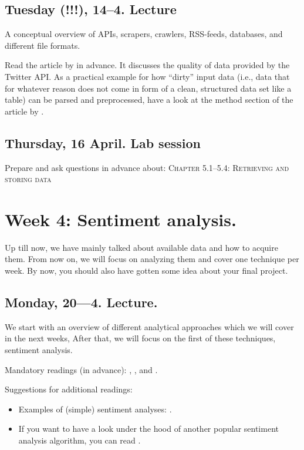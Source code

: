 \subsection*{Tuesday (!!!), 14--4. Lecture}
A conceptual overview of APIs, scrapers, crawlers, RSS-feeds, databases, and different file formats.

Read the article by \cite{Morstatter2013} in advance. It discusses the quality of data provided by the Twitter API. As a practical example for how ``dirty'' input data (i.e., data that for whatever reason does not come in form of a clean, structured data set like a table) can be parsed and preprocessed, have a look at the method section of the article by \cite{Lewis2013}. 


\subsection*{Thursday, 16 April. Lab session}
Prepare and ask questions in advance about:
\textsc{ Chapter 5.1--5.4: Retrieving and storing data}\\




\section*{Week 4: Sentiment analysis.}
Up till now, we have mainly talked about available data and how to acquire them. From now on, we will focus on analyzing them and cover one technique per week. By now, you should also have gotten some idea about your final project.


\subsection*{Monday, 20---4. Lecture.}
We start with an overview of different analytical approaches which we will cover in the next weeks, After that, we will focus on the first of these techniques, sentiment analysis.

Mandatory readings (in advance): \cite{GonzalezBailon2015},  \cite{Hutto2014}, and \cite{Vermeer2019}.

Suggestions for additional readings:
\begin{itemize}
	\item Examples of (simple) sentiment analyses: \cite{Huang2007,Pestian2012, Mostafa2013}. 
	\item If you want to have a look under the hood of another popular sentiment analysis algorithm, you can read \cite{Thelwall2012}.
\end{itemize}



